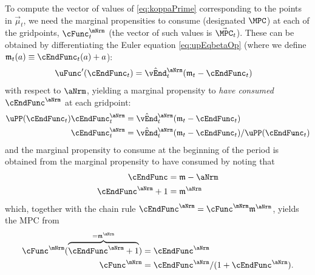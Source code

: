 \documentclass[titlepage, headings=optiontotocandhead]{\econtex}
\begin{document}
To compute the vector of values of \eqref{eq:koppaPrime} corresponding
to the points in $\vec{\mu}_{t}$, we need the marginal propensities to
consume (designated $\MPC$) at each of the gridpoints,
$\cFunc^{\mNrm}_{t}$ (the vector of such values is 
$\vec{\MPC}_{t}$).  These can be obtained by differentiating the
Euler equation \eqref{eq:upEqbetaOp} (where we define
$\mathfrak{m}_{t}({a}) \equiv \cEndFunc_{t}({a})+{a}$):
\begin{equation}\begin{gathered}\begin{aligned}
      \uFunc^{\prime}({\cEndFunc}_{t})   & = \hat{\vEnd}_{t}^{\aNrm}(\mathfrak{m}_{t}-{\cEndFunc}_{t})
    \end{aligned}\end{gathered}\end{equation}
with respect to $\aNrm$, yielding a marginal propensity to
\textit{have consumed} $\cEndFunc^{\aNrm}$ at each gridpoint:
\begin{equation}\begin{gathered}\begin{aligned}
      \uPP(\cEndFunc_{t})\cEndFunc_{t}^{\aNrm}  & = \hat{\vEnd}_{t}^{\aNrm}(\mathfrak{m}_{t}-{\cEndFunc}_{t})
      \\ \cEndFunc_{t}^{\aNrm}  & = \hat{\vEnd}_{t}^{\aNrm}(\mathfrak{m}_{t}-{\cEndFunc}_{t})/\uPP(\cEndFunc_{t})
    \end{aligned}\end{gathered}\end{equation}
and the marginal propensity to consume at the beginning of the period is obtained from the marginal
propensity to have consumed by noting that
\begin{equation*}\begin{gathered}\begin{aligned}
      \cEndFunc  & = \mathfrak{m}-\aNrm
      \\ \cEndFunc^{\aNrm}+1  & = \mathfrak{m}^{\aNrm}
    \end{aligned}\end{gathered}\end{equation*}
which, together with the chain rule $\cEndFunc^{\aNrm}  = \cFunc^{\mNrm}\mathfrak{m}^{\aNrm}$,
yields the MPC from
\begin{equation}\begin{gathered}\begin{aligned}
      \cFunc^{\mNrm}(\overbrace{\cEndFunc^{\aNrm}+1}^{=\mathfrak{m}^{\aNrm}})  & = \cEndFunc^{\aNrm}
      \\ \cFunc^{\mNrm}  & = \cEndFunc^{\aNrm}/(1+\cEndFunc^{\aNrm}) \label{eq:MPCfromMPTHC}.
    \end{aligned}\end{gathered}\end{equation}
\end{document}
